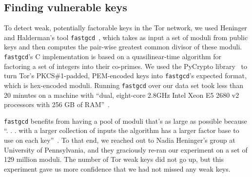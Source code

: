 \subsection{Finding vulnerable keys}
\label{sec:vulnerable-keys}
To detect weak, potentially factorable keys in the Tor network, we used Heninger
and Halderman's tool \texttt{fastgcd}~\cite{fastgcd}, which takes as input a set of
moduli from public keys and then computes the pair-wise greatest common divisor
of these moduli.  \texttt{fastgcd}'s C implementation is based on a quasilinear-time
algorithm for factoring a set of integers into their co-primes.  We used the
PyCrypto library~\cite{pycrypto} to turn Tor's PKCS\#1-padded, PEM-encoded keys
into \texttt{fastgcd}'s expected format, which is hex-encoded moduli.  Running 
\texttt{fastgcd} over our data set took less than 20 minutes on 
a machine with ``dual, eight-core 2.8GHz Intel Xeon E5 2680 v2 processors with 
256 GB of RAM''~\cite{supercompy}.

\texttt{fastgcd} benefits from having a pool of moduli that's as large as possible because 
``. . . with a larger collection of inputs the algorithm has a larger 
factor base to use on each key''~\cite{Heninger2012a}.  
To that end, we reached out to Nadia Heninger's group at University of Pennsylvania, 
and they graciously re-ran our experiment on a set of 129 million 
moduli. The number of Tor weak keys did not go up, but 
this experiment gave us more confidence that we had not missed any weak keys.
